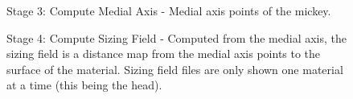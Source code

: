 \documentclass[fleqn,12pt,openany]{book}
\begin{document}
\begin{figure}[htp]
\begin{center}
\end{center}
\caption{\label{fig:MickeyMA}Stage 3: Compute Medial Axis - Medial axis points of the mickey.}
\end{figure} 

\begin{figure}[htp]
\begin{center}
\end{center}
\caption{\label{fig:MickeySF}Stage 4: Compute Sizing Field - Computed from the medial axis, the sizing field is a distance map from the medial axis points to the surface of the material.  Sizing field files are only shown one material at a time (this being the head).}
\end{figure} 
\end{document}
